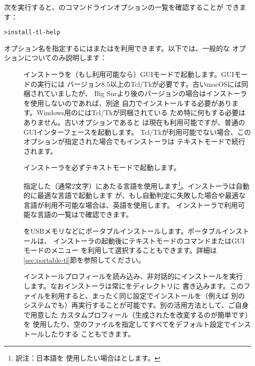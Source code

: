 \documentclass[uplatex,dvipdfmx,12pt]{jsarticle}
\begin{document}
次を実行すると、のコマンドラインオプションの一覧を確認することが
できます：
%
\begin{alltt}
> install-tl -help
\end{alltt}
%
オプション名を指定するには\sopt{}または\lopt{}を利用できます。以下では、一般的な
オプションについてのみ説明します：
%
\begin{description}
\item[]
インストーラを（もし利用可能なら）GUIモードで起動します。GUIモードの実行には
バージョン8.5以上のTcl/Tkが必要です。古いmacOSには同梱されていましたが、
Big Surより後のバージョンの場合は\MacTeX インストーラを使用しないのであれば、別途
自力でインストールする必要があります。Windows用の\TL にはTcl/Tkが同梱されている
ため特に何もする必要はありません。古いオプションであると
は現在も利用可能ですが、普通のGUIインターフェースを起動します。
Tcl/Tkが利用可能でない場合、このオプションが指定された場合でもインストーラは
テキストモードで続行されます。

\item[]
インストーラを必ずテキストモードで起動します。

\item[]
指定した（通常2文字）にあたる言語を使用します\footnote{訳注：日本語を
使用したい場合はとします。}。インストーラは自動的に最適な言語で起動します
が、もし自動判定に失敗した場合や最適な言語が利用不可能な場合は、英語を使用します。
インストーラで利用可能な言語の一覧はで確認できます。

\item[]
\TL をUSBメモリなどにポータブルインストールします。ポータブルインストールは、
インストーラの起動後にテキストモードのコマンドまたはGUIモードのメニュー
を利用して選択することもできます。詳細は\ref{sec:portable-tl}節を参照してください。

\item[]
インストールプロフィールを読み込み、非対話的にインストールを実行
します。なおインストーラは常にをディレクトリに
書き込みます。このファイルを利用すると、まったく同じ設定でインストールを（例えば
別のシステムでも）再実行することが可能です。別の活用方法として、ご自身で用意した
カスタムプロフィール（生成されたを改変するのが簡単です）を
使用したり、空のファイルを指定してすべてをデフォルト設定でインストールしたりする
こともできます。


\end{description}
\end{document}
